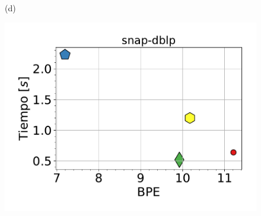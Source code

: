 \begin{figure}
\begin{minipage}{1\textwidth}
\begin{minipage}{0.45\textwidth}
    			(d)
    		\end{minipage}  
    	\end{minipage}
    	
        \begin{minipage}{1\textwidth}
    		\centering
    		\begin{minipage}{0.45\textwidth}
    			\centering
    			\begin{minipage}{0.75\textwidth}
    				\centering
    				\includegraphics[width=1\linewidth]{img/bpeTimes/secuencial/snap-dblp.pdf}
    			\end{minipage}
    			\begin{minipage}{0.2\textwidth}
    				\centering

\end{minipage}
\end{minipage}
\end{minipage}
\end{figure}
